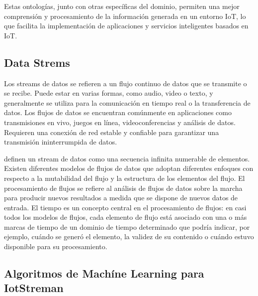 \documentclass[12pt]{article}
\begin{document}
Estas ontologías, junto con otras específicas del dominio, permiten una mejor comprensión y procesamiento de la información generada en un entorno IoT, lo que facilita la implementación de aplicaciones y servicios inteligentes basados en IoT.


\subsection{Data Strems}

Los streams de datos se refieren a un flujo continuo de datos que se transmite o se recibe. Puede estar en varias formas, como audio, video o texto, y generalmente se utiliza para la comunicación en tiempo real o la transferencia de datos. Los flujos de datos se encuentran comúnmente en aplicaciones como transmisiones en vivo, juegos en línea, videoconferencias y análisis de datos. Requieren una conexión de red estable y confiable para garantizar una transmisión ininterrumpida de datos.

\citep{ref50} definen un stream de datos como una secuencia infinita numerable de elementos. Existen diferentes modelos de flujos de datos que adoptan diferentes enfoques con respecto a la mutabilidad del flujo y la estructura de los elementos del flujo. El procesamiento de flujos se refiere al análisis de flujos de datos sobre la marcha para producir nuevos resultados a medida que se dispone de nuevos datos de entrada. El tiempo es un concepto central en el procesamiento de flujos: en casi todos los modelos de flujos, cada elemento de flujo está asociado con una o más marcas de tiempo de un dominio de tiempo determinado que podría indicar, por ejemplo, cuándo se generó el elemento, la validez de su contenido o cuándo estuvo disponible para su procesamiento.

\subsection{Algoritmos de Machíne Learning para IotStreman}
\end{document}

